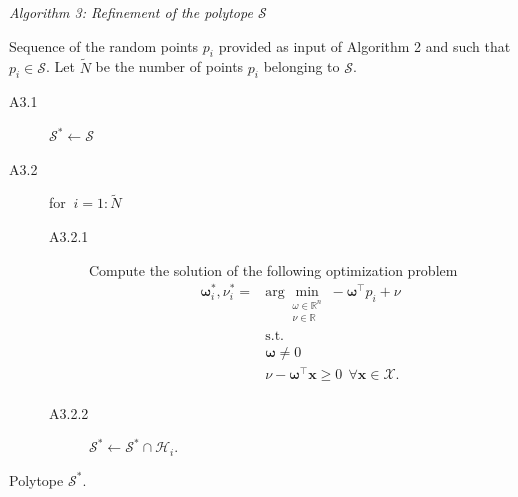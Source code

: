 \documentclass[twocolumn]{autart}
\begin{document}
\begin{algorithm} \emph{Algorithm 3: Refinement of the polytope $\mathcal{S}$} \label{alg2}

  Sequence of the random points $p_i$ provided as input of Algorithm 2 and such that $p_i \in \mathcal{S}$. Let $\tilde{N}$ be the number of points $p_i$ belonging to $\mathcal{S}$.
\begin{description}
\item [A3.1 ] \;  $\mathcal{S}^{*} \leftarrow \mathcal{S}$
  \item[A3.2 ] \; \; \; \; \; for $\ i=1:\tilde{N}$
  \begin{description}
  \item[A3.2.1  ] \; \; \;  \; \; Compute the solution of the following optimization problem
                    \begin{equation} \label{opt:alg22}
  \begin{split}
  \boldsymbol{\omega}^*_i,\nu^*_i= & \mbox{arg}\min_{\begin{array}{c}
                                            \omega \in \mathbb{R}^n \\
                                            \nu \in \mathbb{R}
                                          \end{array}} -\boldsymbol{\omega}^{{\top}}p_i+\nu^{} \\
   & \mbox{s.t. } \\
   & \boldsymbol{\omega} \neq 0 \\
   & \nu- \boldsymbol{\omega}^{\top}   \mathbf{x} \geq 0 \ \ \forall \mathbf{x} \in \mathcal{X}.\\
  \end{split}
  \end{equation}
   \item[A3.2.2] \; \; \; \; \; $\mathcal{S}^{*} \leftarrow \mathcal{S}^{*} \cap \mathcal{H}_i$.
\end{description}
\end{description}
\noindent  [output] Polytope $\mathcal{S}^{*}$.
\end{algorithm}
\end{document}
